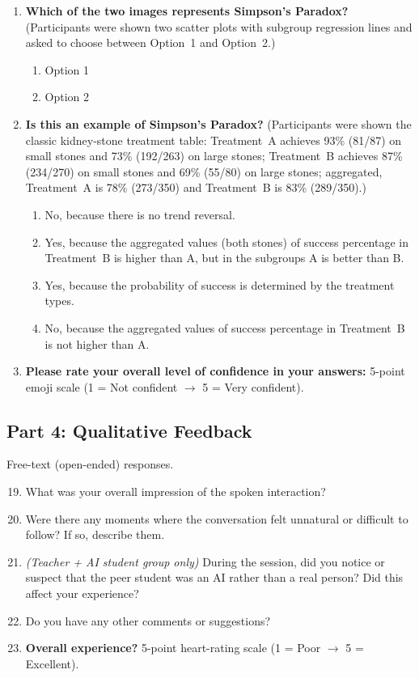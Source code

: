 \documentclass[11pt]{article}
\begin{document}
\begin{enumerate}
\begin{enumerate}
      \item The trial was not randomised, making all results invalid.
    \end{enumerate}
  \item \textbf{Which of the two images represents Simpson's Paradox?}
    (Participants were shown two scatter plots with subgroup regression
    lines and asked to choose between Option~1 and Option~2.)
    \begin{enumerate}
      \item Option 1
      \item Option 2
    \end{enumerate}
  \item \textbf{Is this an example of Simpson's Paradox?} (Participants
    were shown the classic kidney-stone treatment table: Treatment~A
    achieves 93\% (81/87) on small stones and 73\% (192/263) on large
    stones; Treatment~B achieves 87\% (234/270) on small stones and 69\%
    (55/80) on large stones; aggregated, Treatment~A is 78\% (273/350)
    and Treatment~B is 83\% (289/350).)
    \begin{enumerate}
      \item No, because there is no trend reversal.
      \item Yes, because the aggregated values (both stones) of success
        percentage in Treatment~B is higher than A, but in the subgroups
        A is better than B.
      \item Yes, because the probability of success is determined by the
        treatment types.
      \item No, because the aggregated values of success percentage in
        Treatment~B is not higher than A.
    \end{enumerate}
  \item \textbf{Please rate your overall level of confidence in your
    answers:} 5-point emoji scale
    (1 = Not confident $\rightarrow$ 5 = Very confident).
\end{enumerate}

\subsection*{Part 4: Qualitative Feedback}

Free-text (open-ended) responses.

\begin{enumerate}
  \setcounter{enumi}{18}
  \item What was your overall impression of the spoken interaction?
  \item Were there any moments where the conversation felt unnatural or
    difficult to follow? If so, describe them.
  \item \emph{(Teacher + AI student group only)} During the session, did
    you notice or suspect that the peer student was an AI rather than a
    real person? Did this affect your experience?
  \item Do you have any other comments or suggestions?
  \item \textbf{Overall experience?} 5-point heart-rating scale
    (1 = Poor $\rightarrow$ 5 = Excellent).
\end{enumerate}
\end{document}
